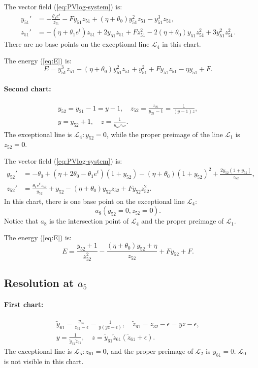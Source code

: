 The vector field  (\ref{eq:PVlog-system}) is:
$$
\begin{aligned}
y_{51}'&=
-\frac{\theta_1 e^t}{z_{51}}
-F y_{51} z_{51} + (\eta + \theta_0) y_{51}^2 z_{51} - y_{51}^3 z_{51}
,
\\
z_{51}'&=
-(\eta+\theta_1 e^t) z_{51}+ 2 y_{51} z_{51} + F z_{51}^2 - 2 (\eta + \theta_0) y_{51} z_{51}^2 + 3 y_{51}^2 z_{51}^2
.
\end{aligned}
$$
There are no base points on the exceptional line $\mathcal{L}_4$ in this chart.

The energy (\ref{eq:E}) is:
$$
E=
y_{51}^3 z_{51}
-(\eta+\theta_0) y_{51}^2 z_{51}
+y_{51}^2
+F y_{51} z_{51}
-\eta y_{51}+F
.
$$

\paragraph{Second chart:}
\begin{gather*}
y_{52}=y_{21}-1=y-1,
\quad
z_{52}=\frac{z_{21}}{y_{21}-1}=\frac1{(y-1)z},
\\
y=y_{52}+1,
\quad
z=\frac{1}{y_{52}z_{52}}.
\end{gather*}
The exceptional line is $\mathcal{L}_4 : y_{52}=0$, while the proper preimage of the line $\mathcal{L}_{1}$ is $z_{52}=0$. 

The vector field  (\ref{eq:PVlog-system}) is:
$$
\begin{aligned}
y_{52}'&=
-\theta_0 + (\eta + 2 \theta_0-\theta_1 e^t) (1 + y_{52}) - (\eta + \theta_0) (1 + y_{52})^2 + 
\frac{ 2 y_{52} (1 + y_{52})}{z_{52}}
 ,
\\
z_{52}'&=\frac{\theta_1 e^t  z_{52}}{y_{52}}+
y_{52} - (\eta + \theta_0) y_{52} z_{52} + F y_{52} z_{52}^2
.
\end{aligned}
$$
In this chart, there is one base point on the exceptional line $\mathcal{L}_4$:
$$
a_8(y_{52}=0,z_{52}=0).
$$
Notice that $a_8$ is the intersection point of $\mathcal{L}_4$ and the proper preimage of  $\mathcal{L}_{1}$.

The energy (\ref{eq:E}) is:
$$
E=
\frac{y_{52}+1}{z_{52}^2}
-\frac{(\eta+\theta_0) y_{52}+\eta}{z_{52}}+F y_{52}+F
.
$$




\subsection{Resolution at $a_5$}\label{a5-blow}

\paragraph{First chart:}
\begin{gather*}
\tilde{y}_{61}=\frac{y_{32}}{z_{32}-\epsilon}=\frac{1}{y(yz-\epsilon)},
\quad
\tilde{z}_{61}=z_{32}-\epsilon=yz-\epsilon,
\\
y=\frac{1}{\tilde{y}_{61}\tilde{z}_{61}},
\quad
z=\tilde{y}_{61}\tilde{z}_{61}(\tilde{z}_{61}+\epsilon).
\end{gather*}
The exceptional line is $\mathcal{L}_5 : z_{61}=0$, and the proper preimage of $\mathcal{L}_{2}$ is $y_{61}=0$.
$\mathcal{L}_0$ is not visible in this chart. 

